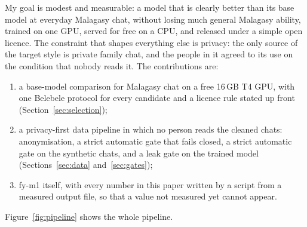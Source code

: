 \documentclass[11pt]{article}
\begin{document}
My goal is modest and measurable: a model that is clearly better than its base model at everyday
Malagasy chat, without losing much general Malagasy ability, trained on one GPU, served for free on a
CPU, and released under a simple open licence. The constraint that shapes everything else is privacy:
the only source of the target style is private family chat, and the people in it agreed to its use on
the condition that nobody reads it. The contributions are:
\begin{enumerate}
  \item a base-model comparison for Malagasy chat on a free 16\,GB T4 GPU, with one Belebele protocol
        for every candidate and a licence rule stated up front (Section~\ref{sec:selection});
  \item a privacy-first data pipeline in which no person reads the cleaned chats: anonymisation, a
        strict automatic gate that fails closed, a strict automatic gate on the synthetic chats, and a
        leak gate on the trained model (Sections~\ref{sec:data} and~\ref{sec:gates});
  \item fy-m1 itself, with every number in this paper written by a script from a measured output file,
        so that a value not measured yet cannot appear.
\end{enumerate}
Figure~\ref{fig:pipeline} shows the whole pipeline.
\end{document}
